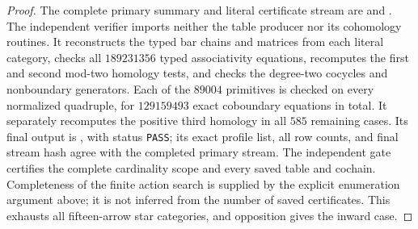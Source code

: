 \begin{proof}
The complete primary summary and literal certificate stream are
 and
.
The independent verifier
 imports neither the
table producer nor its cohomology routines.  It reconstructs
the typed bar chains and matrices from each literal category,
checks all $189231356$ typed associativity equations, recomputes
the first and second mod-two homology tests, and checks the
degree-two cocycles and nonboundary generators.  Each of the
$89004$ primitives is checked on every normalized quadruple,
for $129159493$ exact coboundary equations in total.  It separately
recomputes the positive third homology in all $585$ remaining
cases.  Its final output is
, with status
\texttt{PASS}; its exact profile list, all row counts, and final
stream hash agree with the completed primary stream.  The
independent gate certifies the complete cardinality scope and
every saved table and cochain.  Completeness of the finite
action search is supplied by the explicit enumeration argument
above; it is not inferred from the number of saved certificates.
This exhausts all fifteen-arrow star categories, and opposition
gives the inward case.
\end{proof}
